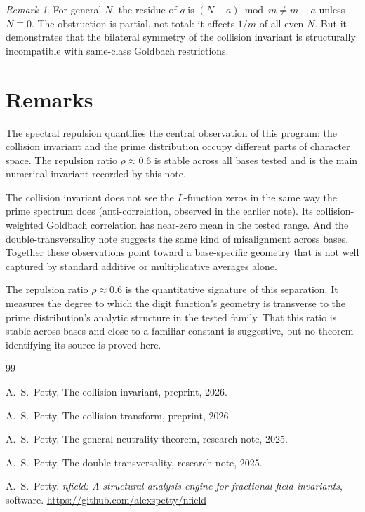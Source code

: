 \documentclass[12pt]{amsart}
\theoremstyle{definition}
\theoremstyle{remark}
\newtheorem{remark}[theorem]{Remark}
\begin{document}
\begin{remark}
For general $N$, the residue of $q$ is
$(N - a) \bmod m \ne m - a$ unless $N \equiv 0$.
The obstruction is partial, not total: it affects
$1/m$ of all even $N$. But it demonstrates that the
bilateral symmetry of the collision invariant is
structurally incompatible with same-class Goldbach
restrictions.
\end{remark}

\section{Remarks}

The spectral repulsion quantifies the central
observation of this program: the collision invariant
and the prime distribution occupy different parts of
character space. The repulsion ratio $\rho \approx 0.6$
is stable across all bases tested and is the main
numerical invariant recorded by this note.

The collision invariant does not see the $L$-function
zeros in the same way the prime spectrum does
(anti-correlation, observed in the earlier note). Its
collision-weighted Goldbach correlation has near-zero
mean in the tested range. And the double-transversality
note suggests the same kind of misalignment across
bases. Together these observations point toward a
base-specific geometry that is not well captured by
standard additive or multiplicative averages alone.

The repulsion ratio $\rho \approx 0.6$ is the
quantitative signature of this separation. It
measures the degree to which the digit function's
geometry is transverse to the prime distribution's
analytic structure in the tested family. That this
ratio is stable across bases and close to a familiar
constant is suggestive, but no theorem identifying its
source is proved here.

\begin{thebibliography}{99}

A.~S.~Petty,
The collision invariant,
preprint, 2026.

A.~S.~Petty,
The collision transform,
preprint, 2026.

A.~S.~Petty,
The general neutrality theorem,
research note, 2025.

A.~S.~Petty,
The double transversality,
research note, 2025.

A.~S.~Petty,
\emph{nfield: A structural analysis engine for fractional
field invariants},
software.
\url{https://github.com/alexspetty/nfield}

\end{thebibliography}
\end{document}
